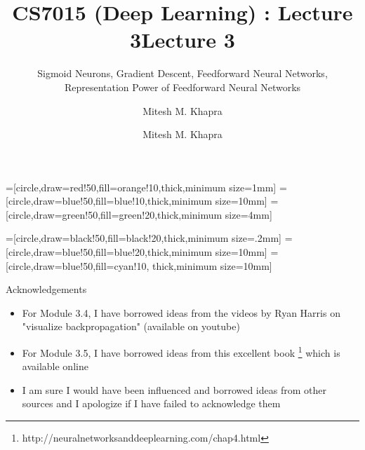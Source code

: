 \documentclass[serif, aspectratio=169]{beamer}
\author{Mitesh M. Khapra}
\title{CS7015 (Deep Learning) : Lecture 3}
\subtitle{Sigmoid Neurons, Gradient Descent, Feedforward Neural Networks, Representation Power of Feedforward Neural Networks}
\institute{Department of Computer Science and Engineering\\ Indian Institute of Technology Madras}
\date{}
\begin{document}
\renewcommand{\thefootnote}{$\star$}


\newcommand\derivative[5]{%
	\tkzDefPointByFct[draw](#1) \tkzGetPoint{start}
	\tkzDefPointByFct[draw](#2) \tkzGetPoint{end}
	\draw[thin,|-|,yshift=-3pt] (start) -- node[black,fill=white,#5] {#3}(start-|end);
	\draw[thin,|-|,xshift=3pt] (start-|end) -- node[black,fill=white,right] {#4}(end);
}

\title{Lecture 3}
\author{Mitesh M. Khapra}
\maketitle


=[circle,draw=red!50,fill=orange!10,thick,minimum size=1mm]
=[circle,draw=blue!50,fill=blue!10,thick,minimum size=10mm]
=[circle,draw=green!50,fill=green!20,thick,minimum size=4mm]

=[circle,draw=black!50,fill=black!20,thick,minimum size=.2mm]
=[circle,draw=blue!50,fill=blue!20,thick,minimum size=10mm]
=[circle,draw=blue!50,fill=cyan!10, thick,minimum size=10mm]


\begin{frame}
\begin{block}{Acknowledgements}
\begin{itemize}\justifying
  \item For Module 3.4, I have borrowed ideas from the videos by Ryan Harris on "visualize backpropagation" (available on youtube)
  \item For Module 3.5, I have borrowed ideas from this excellent book \footnote{http://neuralnetworksanddeeplearning.com/chap4.html} which is available online
  \item I am sure I would have been influenced and borrowed ideas from other sources and I apologize if I have failed to acknowledge them
\end{itemize}
\end{block}
\end{frame}





\end{document}
